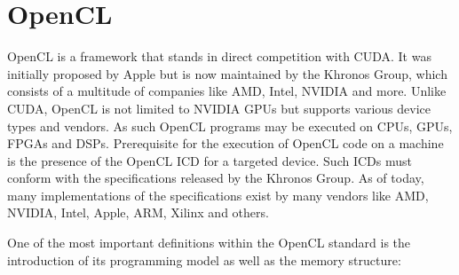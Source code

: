 \section{OpenCL}
\label{opencl}
OpenCL is a framework that stands in direct competition with CUDA. It was initially proposed by Apple but is now maintained by the Khronos Group, which consists of a multitude of companies like AMD, Intel, NVIDIA and more. Unlike CUDA, OpenCL is not limited to NVIDIA GPUs but supports various device types and vendors. As such OpenCL programs may be executed on CPUs, GPUs, FPGAs and DSPs. Prerequisite for the execution of OpenCL code on a machine is the presence of the OpenCL ICD for a targeted device. Such ICDs must conform with the specifications released by the Khronos Group. As of today, many implementations of the specifications exist by many vendors like AMD, NVIDIA, Intel, Apple, ARM, Xilinx and others.

One of the most important definitions within the OpenCL standard is the introduction of its programming model as well as the memory structure:

